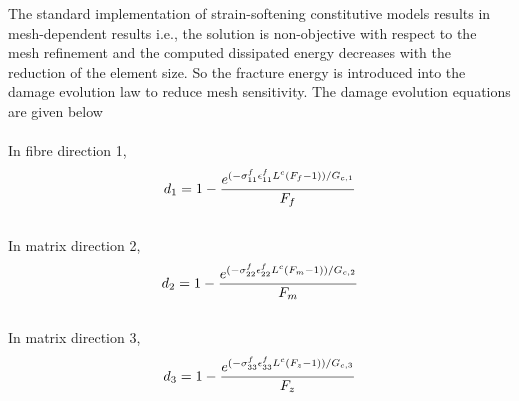 \documentclass[a4paper,12pt]{article}
\begin{document}
The standard implementation of strain-softening constitutive models results in mesh-dependent results i.e., the solution is non-objective with respect to the mesh refinement and the computed dissipated energy decreases with the reduction of the element size. So the fracture energy is introduced into the damage evolution law to reduce mesh sensitivity. The damage evolution equations are given below
\\
\\
In fibre direction 1,
\begin{equation}
\large{ d_{1} = 1 - \frac{e^{(-\sigma_{11}^{f}\epsilon_{11}^{f}L^{c}(F_{f} - 1))    /G_{c,1}}}{F_{f}} }   
\end{equation}
\\
In matrix direction 2,
\begin{equation}
\large{ d_{2} = 1 - \frac{e^{(-\sigma_{22}^{f}\epsilon_{22}^{f}L^{c}(F_{m} - 1))    /G_{c,2}}}{F_{m}} }  
\end{equation}
\\
In matrix direction 3,
\begin{equation}
\large{ d_{3} = 1 - \frac{e^{(-\sigma_{33}^{f}\epsilon_{33}^{f}L^{c}(F_{z} - 1))    /G_{c,3}}}{F_{z}} }  
\end{equation}
\\
\end{document}
